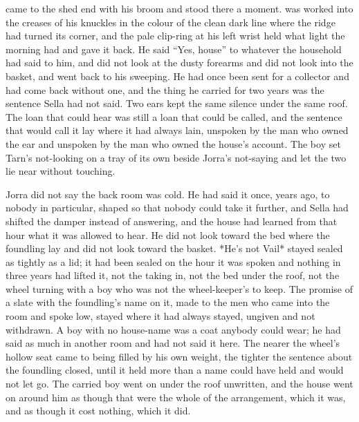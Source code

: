  came to the shed end with his broom and stood there a moment.  was worked into the creases of his knuckles in the colour of the clean dark line where the ridge had turned its corner, and the pale clip-ring at his left wrist held what light the morning had and gave it back. He said “Yes, house” to whatever the household had said to him, and did not look at the dusty forearms and did not look into the basket, and went back to his sweeping. He had once been sent for a collector and had come back without one, and the thing he carried for two years was the sentence Sella had not said. Two ears kept the same silence under the same roof. The loan that could hear was still a loan that could be called, and the sentence that would call it lay where it had always lain, unspoken by the man who owned the ear and unspoken by the man who owned the house's account. The boy set Tarn's not-looking on a tray of its own beside Jorra's not-saying and let the two lie near without touching.

Jorra did not say the back room was cold. He had said it once, years ago, to nobody in particular, shaped so that nobody could take it further, and Sella had shifted the damper instead of answering, and the house had learned from that hour what it was allowed to hear. He did not look toward the bed where the foundling lay and did not look toward the basket. *He's not Vail* stayed sealed as tightly as a lid; it had been sealed on the hour it was spoken and nothing in three years had lifted it, not the taking in, not the bed under the roof, not the wheel turning with a boy who was not the wheel-keeper's to keep. The promise of a slate with the foundling's name on it, made to the men who came into the room and spoke low, stayed where it had always stayed, ungiven and not withdrawn. A boy with no house-name was a coat anybody could wear; he had said as much in another room and had not said it here. The nearer the wheel's hollow seat came to being filled by his own weight, the tighter the sentence about the foundling closed, until it held more than a name could have held and would not let go. The carried boy went on under the roof unwritten, and the house went on around him as though that were the whole of the arrangement, which it was, and as though it cost nothing, which it did.

\scenebreak

